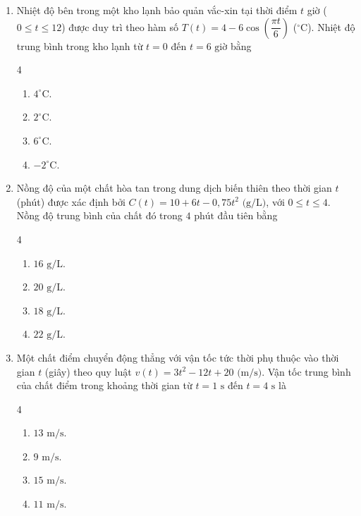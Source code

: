 \documentclass[12pt]{article}
\begin{document}
\begin{enumerate}[label=\textbf{Câu \arabic*.}]
		\item Nhiệt độ bên trong một kho lạnh bảo quản vắc-xin tại thời điểm $t$ giờ ($0 \le t \le 12$) được duy trì theo hàm số $T(t) = 4 - 6\cos\left(\dfrac{\pi t}{6}\right)$ ($^\circ\text{C}$). Nhiệt độ trung bình trong kho lạnh từ $t = 0$ đến $t = 6\text{ giờ}$ bằng
		\begin{multicols}{4}
			\begin{enumerate}[label=\textbf{\Alph*.}]
				\item $4^\circ\text{C}$.
				\item $2^\circ\text{C}$.
				\item $6^\circ\text{C}$.
				\item $-2^\circ\text{C}$.
			\end{enumerate}
		\end{multicols}
		
		\item Nồng độ của một chất hòa tan trong dung dịch biến thiên theo thời gian $t$ (phút) được xác định bởi $C(t) = 10 + 6t - 0{,}75t^2\text{ (g/L)}$, với $0 \le t \le 4$. Nồng độ trung bình của chất đó trong $4\text{ phút}$ đầu tiên bằng
		\begin{multicols}{4}
			\begin{enumerate}[label=\textbf{\Alph*.}]
				\item $16\text{ g/L}$.
				\item $20\text{ g/L}$.
				\item $18\text{ g/L}$.
				\item $22\text{ g/L}$.
			\end{enumerate}
		\end{multicols}
		
		\item Một chất điểm chuyển động thẳng với vận tốc tức thời phụ thuộc vào thời gian $t$ (giây) theo quy luật $v(t) = 3t^2 - 12t + 20\text{ (m/s)}$. Vận tốc trung bình của chất điểm trong khoảng thời gian từ $t = 1\text{ s}$ đến $t = 4\text{ s}$ là
		\begin{multicols}{4}
			\begin{enumerate}[label=\textbf{\Alph*.}]
				\item $13\text{ m/s}$.
				\item $9\text{ m/s}$.
				\item $15\text{ m/s}$.
				\item $11\text{ m/s}$.
			\end{enumerate}
		\end{multicols}
		

\end{enumerate}
\end{document}
